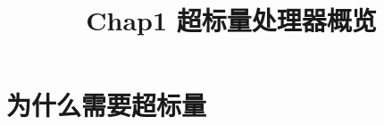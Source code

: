 \documentclass{article}
\title{Chap1 超标量处理器概览}
\author{}
\date{}
\begin{document}
  \maketitle
  \section{为什么需要超标量}
  
\end{document}
